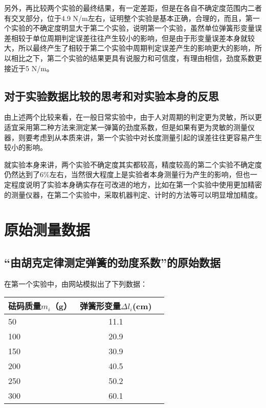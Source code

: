 \documentclass[UTF8]{ctexart}
\begin{document}
另外，再比较两个实验的最终结果，有一定差距，但是在各自不确定度范围内二者有交叉部分，位于4.9 N/m左右，证明整个实验是基本正确，合理的，而且，第一个实验的不确定度明显大于第二个实验，说明第一个实验，虽然单位弹簧形变量误差相较于单位周期判定误差往往产生较小的影响，但是由于形变量误差本身就较大，所以最终产生了相较于第二个实验中周期判定误差产生的影响更大的影响，所以相比之下，第二个实验的结果更具有说服力和可信度，有理由相信，劲度系数更接近于5 N/m。
\subsection{对于实验数据比较的思考和对实验本身的反思}
由上述两个比较来看，在一般日常实验中，由于人对周期的判定更为灵敏，所以更适宜采用第二种方法来测定某一弹簧的劲度系数，但是如果有更为灵敏的测量仪器，则要考虑到从本质来讲，第一个实验中对长度测量引起的误差往往更容易产生较小的影响。


就实验本身来讲，两个实验不确定度其实都较高，精度较高的第二个实验不确定度仍然达到了6\%左右，当然很大程度上是实验者本身测量行为产生的影响，但也一定程度说明了实验本身确实存在可改进的地方，比如在第一个实验中使用更加精密的测量仪器，在第二个实验中，采取机器判定、计时的方法等可以明显增加精度。
\section{原始测量数据}
\subsection{“由胡克定律测定弹簧的劲度系数”的原始数据}
在第一个实验中，由网站模拟出了下列数据：
\begin{table}[htbp!] 
\centering 
\begin{tabular}{|l|c|r|} 
\hline 
 砝码质量$m_i$（g） &  弹簧形变量$\Delta l_i$(cm)  \\ 
\hline 
 50 & 11.1  \\ 
\hline 
 100 & 20.9 \\ 
\hline 
 150 & 30.9  \\ 
\hline 
 200 & 40.5  \\ 
\hline 
 250 & 50.2  \\ 
\hline 
 300 & 60.1  \\ 
\hline
\end{tabular} 
\end{table}
\end{document}
